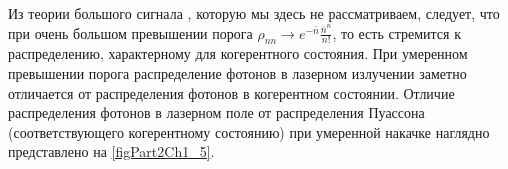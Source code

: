 



Из теории большого сигнала \cite{bScally1974}, которую мы здесь
не рассматриваем, следует, что при очень большом превышении порога 
$\rho_{nn} \rightarrow e^{-\bar{n}}\frac{\bar{n}^n}{n!}$, то есть стремится 
к распределению, характерному для когерентного состояния. При
умеренном превышении порога распределение фотонов в лазерном излучении 
заметно отличается от распределения фотонов в когерентном
состоянии. Отличие распределения фотонов в лазерном поле от
распределения Пуассона 
(соответствующего когерентному состоянию) при
умеренной накачке наглядно представлено на \autoref{figPart2Ch1_5}.
